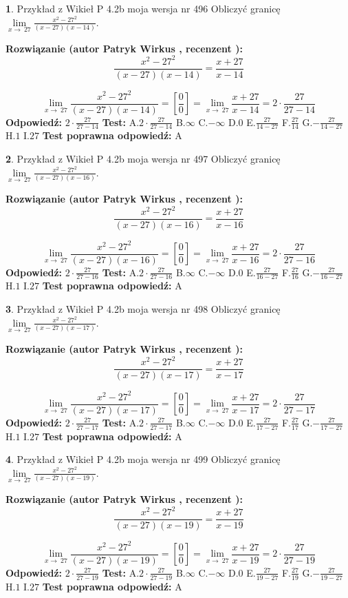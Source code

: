 \documentclass[12pt, a4paper]{article}
\theoremstyle{definition} %
\newtheorem{zad}{}
\newcommand{\zadStart}[1]{\begin{zad}#1\newline}
\newcommand{\zadStop}{\end{zad}}
\newcommand{\rozwStart}[2]{\noindent \textbf{Rozwiązanie (autor #1 , recenzent #2): }\newline}
\newcommand{\rozwStop}{\newline}
\newcommand{\odpStart}{\noindent \textbf{Odpowiedź:}\newline}
\newcommand{\odpStop}{\newline}
\newcommand{\testStart}{\noindent \textbf{Test:}\newline}
\newcommand{\testStop}{\newline}
\newcommand{\kluczStart}{\noindent \textbf{Test poprawna odpowiedź:}\newline}
\newcommand{\kluczStop}{\newline}
\begin{document}
\zadStart{Przykład z Wikieł P 4.2b moja wersja nr 496}
Obliczyć granicę $\lim\limits_{x\to\ 27}\frac{x^{2}-27^{2}}{(x-27)(x-14)}$.
\zadStop
\rozwStart{Patryk Wirkus}{}
$$\frac{x^{2}-27^{2}}{(x-27)(x-14)}=\frac{x+27}{x-14}$$

$$\lim\limits_{x\to\ 27}\frac{x^{2}-27^{2}}{(x-27)(x-14)}=[\frac{0}{0}]=\lim\limits_{x\to\ 27}\frac{x+27}{x-14}=2 \cdot \frac{27}{27-14}$$
\rozwStop
\odpStart
$2 \cdot \frac{27}{27-14}$
\odpStop
\testStart
A.$2 \cdot \frac{27}{27-14}$
B.$\infty$
C.$-\infty$
D.$0$
E.$\frac{27}{14-27}$
F.$\frac{27}{14}$
G.$-\frac{27}{14-27}$
H.$1$
I.$27$
\testStop
\kluczStart
A
\kluczStop



\zadStart{Przykład z Wikieł P 4.2b moja wersja nr 497}
Obliczyć granicę $\lim\limits_{x\to\ 27}\frac{x^{2}-27^{2}}{(x-27)(x-16)}$.
\zadStop
\rozwStart{Patryk Wirkus}{}
$$\frac{x^{2}-27^{2}}{(x-27)(x-16)}=\frac{x+27}{x-16}$$

$$\lim\limits_{x\to\ 27}\frac{x^{2}-27^{2}}{(x-27)(x-16)}=[\frac{0}{0}]=\lim\limits_{x\to\ 27}\frac{x+27}{x-16}=2 \cdot \frac{27}{27-16}$$
\rozwStop
\odpStart
$2 \cdot \frac{27}{27-16}$
\odpStop
\testStart
A.$2 \cdot \frac{27}{27-16}$
B.$\infty$
C.$-\infty$
D.$0$
E.$\frac{27}{16-27}$
F.$\frac{27}{16}$
G.$-\frac{27}{16-27}$
H.$1$
I.$27$
\testStop
\kluczStart
A
\kluczStop



\zadStart{Przykład z Wikieł P 4.2b moja wersja nr 498}
Obliczyć granicę $\lim\limits_{x\to\ 27}\frac{x^{2}-27^{2}}{(x-27)(x-17)}$.
\zadStop
\rozwStart{Patryk Wirkus}{}
$$\frac{x^{2}-27^{2}}{(x-27)(x-17)}=\frac{x+27}{x-17}$$

$$\lim\limits_{x\to\ 27}\frac{x^{2}-27^{2}}{(x-27)(x-17)}=[\frac{0}{0}]=\lim\limits_{x\to\ 27}\frac{x+27}{x-17}=2 \cdot \frac{27}{27-17}$$
\rozwStop
\odpStart
$2 \cdot \frac{27}{27-17}$
\odpStop
\testStart
A.$2 \cdot \frac{27}{27-17}$
B.$\infty$
C.$-\infty$
D.$0$
E.$\frac{27}{17-27}$
F.$\frac{27}{17}$
G.$-\frac{27}{17-27}$
H.$1$
I.$27$
\testStop
\kluczStart
A
\kluczStop



\zadStart{Przykład z Wikieł P 4.2b moja wersja nr 499}
Obliczyć granicę $\lim\limits_{x\to\ 27}\frac{x^{2}-27^{2}}{(x-27)(x-19)}$.
\zadStop
\rozwStart{Patryk Wirkus}{}
$$\frac{x^{2}-27^{2}}{(x-27)(x-19)}=\frac{x+27}{x-19}$$

$$\lim\limits_{x\to\ 27}\frac{x^{2}-27^{2}}{(x-27)(x-19)}=[\frac{0}{0}]=\lim\limits_{x\to\ 27}\frac{x+27}{x-19}=2 \cdot \frac{27}{27-19}$$
\rozwStop
\odpStart
$2 \cdot \frac{27}{27-19}$
\odpStop
\testStart
A.$2 \cdot \frac{27}{27-19}$
B.$\infty$
C.$-\infty$
D.$0$
E.$\frac{27}{19-27}$
F.$\frac{27}{19}$
G.$-\frac{27}{19-27}$
H.$1$
I.$27$
\testStop
\kluczStart
A
\kluczStop
\end{document}
